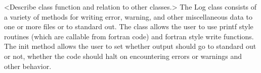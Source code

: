 %


<Describe class function and relation to other classes.>
The Log class consists of a variety of methods for writing error, warning, and other
miscellaneous data to one or more files or to standard out. The class  allows the user
to use printf style routines (which are callable from fortran code) and fortran style 
write functions. The init method allows the user to set whether output should go to
standard out or not, whether the code should halt on encountering errors or warnings 
and other behavior.
